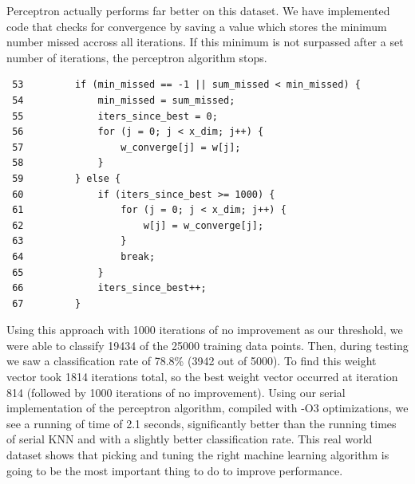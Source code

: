 \documentclass{article}
\begin{document}
Perceptron actually performs far better on this dataset. We have implemented code that checks for convergence by saving a value which stores the minimum number missed accross all iterations. If this minimum is not surpassed after a set number of iterations, the perceptron algorithm stops.
\begin{verbatim}
 53         if (min_missed == -1 || sum_missed < min_missed) {
 54             min_missed = sum_missed;
 55             iters_since_best = 0;
 56             for (j = 0; j < x_dim; j++) {
 57                 w_converge[j] = w[j];
 58             }
 59         } else {
 60             if (iters_since_best >= 1000) {
 61                 for (j = 0; j < x_dim; j++) {
 62                     w[j] = w_converge[j];
 63                 }
 64                 break;
 65             }
 66             iters_since_best++;
 67         }
\end{verbatim}

Using this approach with 1000 iterations of no improvement as our threshold, we were able to classify 19434 of the 25000 training data points. Then, during testing we saw a classification rate of 78.8\% (3942 out of 5000). To find this weight vector took 1814 iterations total, so the best weight vector occurred at iteration 814 (followed by 1000 iterations of no improvement). Using our serial implementation of the perceptron algorithm, compiled with -O3 optimizations, we see a running of time of 2.1 seconds, significantly better than the running times of serial KNN and with a slightly better classification rate. This real world dataset shows that picking and tuning the right machine learning algorithm is going to be the most important thing to do to improve performance.
\clearpage
\end{document}
